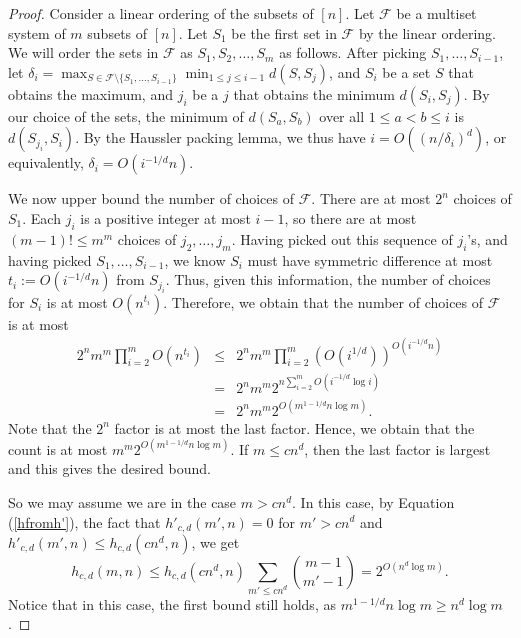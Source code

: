 \documentclass[10pt,a4paper]{amsart}
\begin{document}
 \begin{proof} 
Consider a linear ordering of the subsets of $[n]$. Let $\mathcal{F}$ be a multiset system of $m$ subsets of $[n]$. Let $S_1$ be the first set in $\mathcal{F}$ by the linear ordering. We will order the sets in $\mathcal{F}$ as $S_1,S_2,\ldots,S_m$ as follows. After picking $S_1,\ldots,S_{i-1}$, let $\delta_i=\max_{S \in \mathcal{F} \setminus \{S_1,\ldots,S_{i-1}\}} \min_{1 \leq j \leq i-1} d(S,S_j)$, and $S_i$ be a set $S$ that obtains the maximum, and $j_i$ be a $j$ that obtains the minimum $d(S_i,S_j)$. By our choice of the sets, 
the minimum of $d(S_a,S_b)$ over all $1 \leq a < b \leq i$ is $d(S_{j_i},S_i)$. By the Haussler packing lemma, we thus have $i = O((n/\delta_i)^d)$, or equivalently, $\delta_i = O(i^{-1/d}n)$. 

We now upper bound the number of choices of $\mathcal{F}$. There are at most $2^n$ choices of $S_1$. Each $j_i$ is a positive integer at most $i-1$, so there are at most $(m-1)! \leq m^m$ choices of $j_2,\ldots,j_m$. Having picked out this sequence of $j_i$'s, and having picked $S_1,\ldots,S_{i-1}$, we know $S_i$ must have symmetric difference at most $t_i:=O(i^{-1/d}n)$ from $S_{j_i}$. Thus, given this information, the number of choices for $S_i$ is at most $O(n^{t_i})$. Therefore, we obtain that the number of choices of $\mathcal{F}$ is at most 
\begin{eqnarray*} 2^n m^m \prod_{i=2}^m O(n^{t_i}) & \leq &  2^n m^m \prod_{i=2}^m (O(i^{1/d}))^{O(i^{-1/d}n)}\\ &= & 2^n m^m 2^{n\sum_{i=2}^m O(i^{-1/d}\log i)} \\ & = & 2^n m^m 2^{O(m^{1-1/d} n \log m)}.\end{eqnarray*} 
Note that the $2^n$ factor is at most the last factor. Hence, we obtain that the count is at most 
$m^m2^{O(m^{1-1/d} n \log m)}$. If $m \leq cn^d$, then the last factor is largest and this gives the desired bound. 

So we may assume we are in the case $m > cn^d$. In this case, by Equation (\ref{hfromh'}), the fact that $h'_{c,d}(m',n)=0$ for $m' > cn^d$ and $h'_{c,d}(m',n) \leq h_{c,d}(cn^d,n)$, we get $$h_{c,d}(m,n) \leq h_{c,d}(cn^d,n)\sum_{m' \leq cn^d}{m-1 \choose m'-1} = 2^{O(n^d \log m)}.$$
Notice that in this case, the first bound still holds, as $m^{1-1/d}n \log m \geq n^d \log m$. 







 \end{proof}
\end{document}
